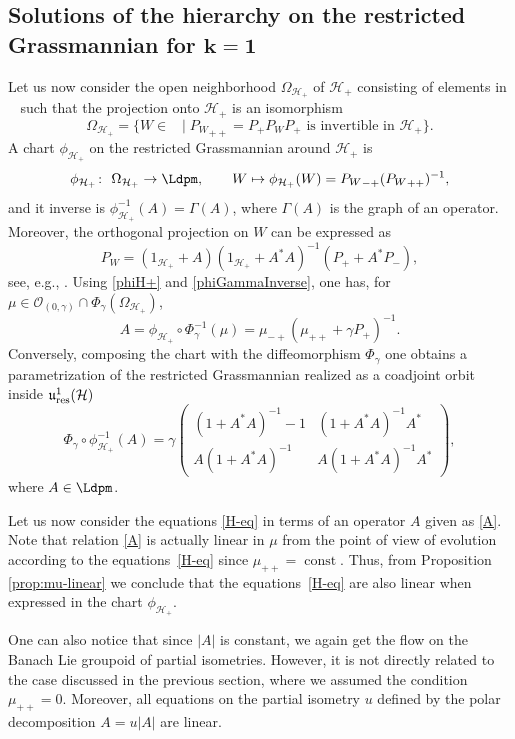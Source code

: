 \documentclass[10pt,a4paper]{amsart}
\theoremstyle{definition}
\numberwithin{equation}{section}
\renewcommand{\H}{\mathcal{H}}
\DeclareMathOperator{\Gr}{Gr_{res}(\H,\H_+)}
\newcommand{\urp}{\mathfrak u_{\textnormal{res}}^1(\H)}
\DeclareMathOperator{\const}{const}
\newcommand{\abs}[1]{\left\vert#1\right\vert}
\renewcommand{\to}{\rightarrow}
\newcommand{\be}{\begin{equation}}
\newcommand{\ee}{\end{equation}}
\begin{document}
\subsection[Solutions of the hierarchy on the restricted Grassmannian for k = 1]{Solutions of the hierarchy on the restricted Grassmannian for $\boldsymbol{k = 1}$}
Let us now consider the open neighborhood $\Omega_{\H_+}$ of $\H_+$ consisting of elements in $\Gr$ such that the projection onto $\H_+$ is an isomorphism
\[
\Omega_{\H_+}= \{ W \in \Gr \mid {P_W}_{++}= P_+ P_W P_+ \textrm{ is invertible in } \H_+\}.
\]
A chart $\phi_{\H_+}$ on the restricted Grassmannian around $\H_+$ is
\be \label{phiH+}
\phi_{\H_+}\colon\ \Omega_{\H_+} \to \Ldpm,\qquad
 W \mapsto \phi_{\H_+}(W)= {P_W}_{-+}({P_W}_{++})^{-1},
\ee
and it inverse is
$\phi_{\H_+}^{-1}(A) = \Gamma(A)$,
where $\Gamma(A)$ is the graph of an operator. Moreover, the orthogonal projection on $W$ can be expressed as
\[ P_W = (1_{\H_+} + A)(1_{\H_+}+A^*A)^{-1}(P_+ + A^* P_-),\]
see, e.g., \cite{GJS-partiso}. Using \eqref{phiH+} and \eqref{phiGammaInverse}, one has, for $\mu \in \mathcal O_{(0,\gamma)}\cap \Phi_\gamma(\Omega_{\H_+})$,
\be \label{A} A = \phi_{\H_+}\circ\Phi_\gamma^{-1}(\mu) =
\mu_{-+}(\mu_{++}+\gamma P_+)^{-1}.\ee
Conversely, composing the chart \smash{$\phi_{\H_+}^{-1} $} with the diffeomorphism $\Phi_\gamma$ one obtains a parametrization of the restricted Grassmannian realized as a coadjoint orbit inside $\urp$
\be \label{coord}
\Phi_\gamma\circ\phi_{\H_+}^{-1}(A) = \gamma\left(
\begin{matrix}
 (1+A^*A)^{-1} - 1& (1+A^*A)^{-1}A^*\\
 A(1+A^*A)^{-1} & A(1+A^*A)^{-1}A^*
\end{matrix}
\right),
\ee
where $A\in \Ldpm$.

Let us now consider the equations \eqref{H-eq} in terms of an operator $A$ given as \eqref{A}. Note that relation \eqref{A} is actually linear in $\mu$ from the point of view of evolution according to the equations~\eqref{H-eq} since $\mu_{++}=\const$. Thus, from Proposition \ref{prop:mu-linear} we conclude that the equations~\eqref{H-eq} are also linear when expressed in the chart $\phi_{\H_+}$.

One can also notice that since $\abs A$ is constant, we again get the flow on the Banach Lie groupoid of partial isometries. However, it is not directly related to the case discussed in the previous section, where we assumed the condition $\mu_{++}=0$. Moreover, all equations on the partial isometry $u$ defined by the polar decomposition $A=u\abs A$ are linear.
\end{document}
